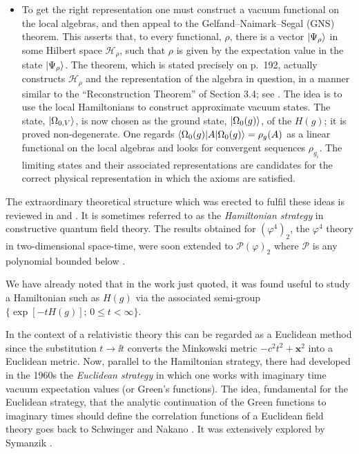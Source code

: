 \begin{itemize}
\item[(e)] To get the right representation one must construct a vacuum
  functional on the local algebras, and then appeal to the
  Gelfand--Naimark--Segal (GNS) theorem. This asserts that, to every
  functional, $\rho$, there is a vector $\lvert \Psi_\rho\rangle$ in some Hilbert
  space $\mathcal{H}_\rho$, such that $\rho$ is given by the expectation value
  in the state $\lvert \Psi_\rho\rangle$. The theorem, which is stated precisely on
  p.~192, actually constructs $\mathcal{H}_\rho$ and the representation of the
  algebra in question, in a manner similar to the ``Reconstruction Theorem''
  of Section 3.4; see \cite{pct-app-67}. The idea is to use the local Hamiltonians to
  construct approximate vacuum states. The state,
  $\lvert \Omega_{0,V}\rangle$, is now chosen as the ground state,
  $\lvert \Omega_0(g)\rangle$, of the $H(g)$; it is proved non-degenerate. One regards
  $\langle \Omega_0(g)\vert A\vert \Omega_0(g)\rangle=\rho_g(A)$ as a linear functional on
  the local algebras and looks for convergent sequences $\rho_{g_i}$. The
  limiting states and their associated representations are candidates for the
  correct physical representation in which the axioms are satisfied.
\end{itemize}

The extraordinary theoretical structure which was erected to fulfil these
ideas is reviewed in \cite{pct-app-25} and \cite{pct-app-26}. It is sometimes referred to as the
\emph{Hamiltonian strategy} in constructive quantum field theory. The results
obtained for $(\varphi^4)_2$, the $\varphi^4$ theory in two-dimensional
space-time, were soon extended to $\mathcal{P}(\varphi)_2$ where $\mathcal{P}$
is any polynomial bounded below \cite{pct-app-18,pct-app-27}.

We have already noted that in the work just quoted, it was found useful to
study a Hamiltonian such as $H(g)$ via the associated semi-group
$\bigl\{\exp[-tH(g)];\,0\leq t<\infty\bigr\}$.

In the context of a relativistic theory this can be regarded as a Euclidean
method since the substitution $t\to\ii t$ converts the Minkowski metric
$-c^2t^2+\mathbf{x}^2$ into a Euclidean metric. Now, parallel to the
Hamiltonian strategy, there had developed in the 1960s the \emph{Euclidean
strategy} in which one works with imaginary time vacuum expectation values
(or Green's functions). The idea, fundamental for the Euclidean strategy,
that the analytic continuation of the Green functions to imaginary times
should define the correlation functions of a Euclidean field theory goes back
to Schwinger and Nakano \cite{pct-app-28,pct-app-29}. It was extensively explored by Symanzik
\cite{pct-app-30,pct-app-31,pct-app-32}.

